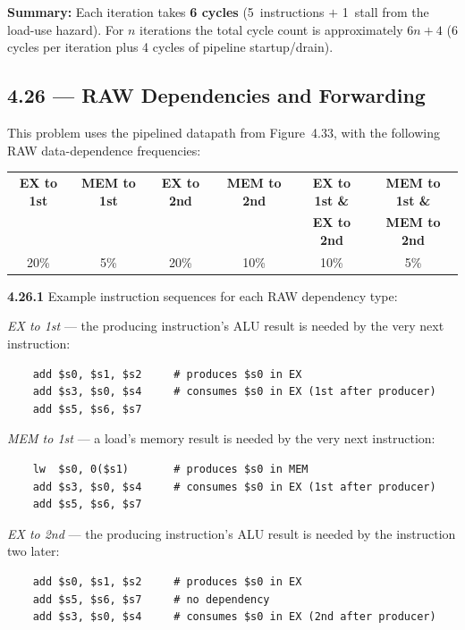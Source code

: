 \noindent \textbf{Summary:} Each iteration takes \textbf{6 cycles}
(5~instructions $+$ 1~stall from the load-use hazard).  For $n$ iterations
the total cycle count is approximately $6n + 4$ (6 cycles per iteration
plus 4 cycles of pipeline startup/drain).
\subsection*{4.26 --- RAW Dependencies and Forwarding}
\hypertarget{sol-4.26}{}

This problem uses the pipelined datapath from Figure~4.33, with the following
RAW data-dependence frequencies:

\begin{center}
\begin{tabular}{cccccc}
\toprule
\textbf{EX to 1st} & \textbf{MEM to 1st} & \textbf{EX to 2nd} &
\textbf{MEM to 2nd} & \textbf{EX to 1st \&} & \textbf{MEM to 1st \&} \\
& & & & \textbf{EX to 2nd} & \textbf{MEM to 2nd} \\
\midrule
20\% & 5\% & 20\% & 10\% & 10\% & 5\% \\
\bottomrule
\end{tabular}
\end{center}

\medskip\noindent\textbf{4.26.1}
Example instruction sequences for each RAW dependency type:

\textit{EX to 1st} --- the producing instruction's ALU result is needed by the
very next instruction:
\begin{verbatim}
    add $s0, $s1, $s2     # produces $s0 in EX
    add $s3, $s0, $s4     # consumes $s0 in EX (1st after producer)
    add $s5, $s6, $s7
\end{verbatim}

\textit{MEM to 1st} --- a load's memory result is needed by the very next
instruction:
\begin{verbatim}
    lw  $s0, 0($s1)       # produces $s0 in MEM
    add $s3, $s0, $s4     # consumes $s0 in EX (1st after producer)
    add $s5, $s6, $s7
\end{verbatim}

\textit{EX to 2nd} --- the producing instruction's ALU result is needed by the
instruction two later:
\begin{verbatim}
    add $s0, $s1, $s2     # produces $s0 in EX
    add $s5, $s6, $s7     # no dependency
    add $s3, $s0, $s4     # consumes $s0 in EX (2nd after producer)
\end{verbatim}

